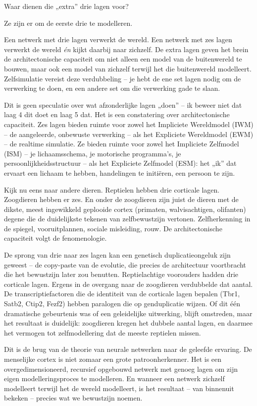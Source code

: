 \documentclass[11pt, twoside, openright]{book}
\begin{document}
Waar dienen die „extra” drie lagen voor?

Ze zijn er om de eerste drie te modelleren.

Een netwerk met drie lagen verwerkt de wereld. Een netwerk met zes lagen verwerkt de wereld \textit{én} kijkt daarbij naar zichzelf. De extra lagen geven het brein de architectonische capaciteit om niet alleen een model van de buitenwereld te bouwen, maar ook een model van zichzelf terwijl het die buitenwereld modelleert. Zelfsimulatie vereist deze verdubbeling -- je hebt de ene set lagen nodig om de verwerking te doen, en een andere set om die verwerking gade te slaan.

Dit is geen speculatie over wat afzonderlijke lagen „doen” -- ik beweer niet dat laag 4 dit doet en laag 5 dat. Het is een constatering over architectonische capaciteit. Zes lagen bieden ruimte voor zowel het Impliciete Wereldmodel (IWM) -- de aangeleerde, onbewuste verwerking -- als het Expliciete Wereldmodel (EWM) -- de realtime simulatie. Ze bieden ruimte voor zowel het Impliciete Zelfmodel (ISM) -- je lichaamsschema, je motorische programma's, je persoonlijkheidsstructuur -- als het Expliciete Zelfmodel (ESM): het „ik” dat ervaart een lichaam te hebben, handelingen te initiëren, een persoon te zijn.

Kijk nu eens naar andere dieren. Reptielen hebben drie corticale lagen. Zoogdieren hebben er zes. En onder de zoogdieren zijn juist de dieren met de dikste, meest ingewikkeld geplooide cortex (primaten, walvisachtigen, olifanten) degene die de duidelijkste tekenen van zelfbewustzijn vertonen. Zelfherkenning in de spiegel, vooruitplannen, sociale misleiding, rouw. De architectonische capaciteit volgt de fenomenologie.

De sprong van drie naar zes lagen kan een genetisch duplicatieongeluk zijn geweest -- de copy-paste van de evolutie, die precies de architectuur voortbracht die het bewustzijn later zou benutten. Reptielachtige voorouders hadden drie corticale lagen. Ergens in de overgang naar de zoogdieren verdubbelde dat aantal. De transcriptiefactoren die de identiteit van de corticale lagen bepalen (Tbr1, Satb2, Ctip2, Fezf2) hebben paralogen die op genduplicatie wijzen. Of dit één dramatische gebeurtenis was of een geleidelijke uitwerking, blijft omstreden, maar het resultaat is duidelijk: zoogdieren kregen het dubbele aantal lagen, en daarmee het vermogen tot zelfmodellering dat de meeste reptielen missen.

Dit is de brug van de theorie van neurale netwerken naar de geleefde ervaring. De menselijke cortex is niet zomaar een grote patroonherkenner. Het is een overgedimensioneerd, recursief opgebouwd netwerk met genoeg lagen om zijn eigen modelleringsproces te modelleren. En wanneer een netwerk zichzelf modelleert terwijl het de wereld modelleert, is het resultaat -- van binnenuit bekeken -- precies wat we bewustzijn noemen.
\end{document}
